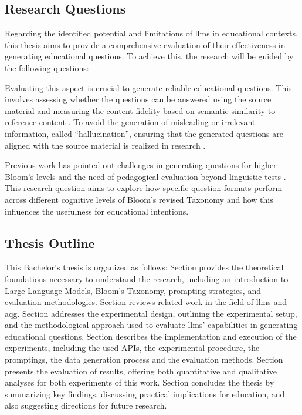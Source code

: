 \subsection{Research Questions}

Regarding the identified potential and limitations of \acp{llm} in educational contexts, this thesis aims to provide a comprehensive evaluation of their effectiveness in generating educational questions. To achieve this, the research will be guided by the following questions:

 Evaluating this aspect is crucial to generate reliable educational questions. This involves assessing whether the questions can be answered using the source material \cite{maity_can_2025,moore_assessing_2022,scaria_automated_2024} and measuring the content fidelity based on semantic similarity to reference content \cite{li_planning_2024}. To avoid the generation of misleading or irrelevant information, called \enquote{hallucination}, ensuring that the generated questions are aligned with the source material is realized in research \cite{al_faraby_analysis_2024}.

 Previous work has pointed out challenges in generating questions for higher Bloom's levels \cite{scaria_automated_2024} and the need of pedagogical evaluation beyond linguistic tests \cite{horbach_linguistic_2020,steuer_i_2021}. This research question aims to explore how specific question formats perform across different cognitive levels of Bloom's revised Taxonomy \cite{krathwohl_revision_2002} and how this influences the usefulness for educational intentions.

\subsection{Thesis Outline}

This Bachelor's thesis is organized as follows:
Section  provides the theoretical foundations necessary to understand the research, including an introduction to Large Language Models, Bloom's Taxonomy, prompting strategies, and evaluation methodologies.
Section  reviews related work in the field of \acp{llm} and \ac{aqg}.
Section  addresses the experimental design, outlining the experimental setup, and the methodological approach used to evaluate \acp{llm}' capabilities in generating educational questions.
Section  describes the implementation and execution of the experiments, including the used APIs, the experimental procedure, the promptings, the data generation process and the evaluation methods.
Section  presents the evaluation of results, offering both quantitative and qualitative analyses for both experiments of this work.
Section  concludes the thesis by summarizing key findings, discussing practical implications for education, and also suggesting directions for future research.
